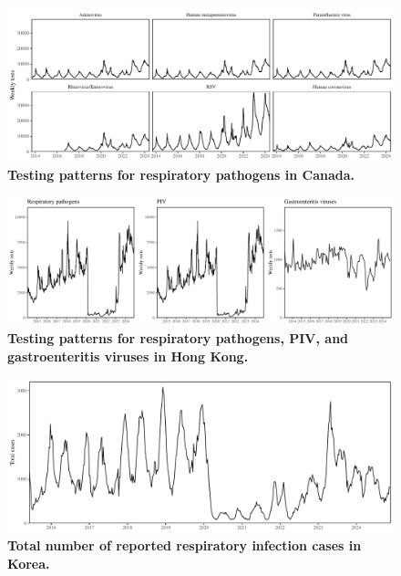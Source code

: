 \documentclass[12pt]{article}
\begin{document}
\pagebreak

\begin{figure}[!th]
\begin{center}
\includegraphics[width=\textwidth]{../figure_test/figure_test_canada.pdf}
\caption{
\textbf{Testing patterns for respiratory pathogens in Canada.}
}
\end{center}
\end{figure}

\pagebreak

\begin{figure}[!th]
\begin{center}
\includegraphics[width=\textwidth]{../figure_test/figure_test_hongkong.pdf}
\caption{
\textbf{Testing patterns for respiratory pathogens, PIV, and gastroenteritis viruses in Hong Kong.}
}
\end{center}
\end{figure}


\pagebreak

\begin{figure}[!th]
\begin{center}
\includegraphics[width=\textwidth]{../figure_test/figure_test_korea.pdf}
\caption{
\textbf{Total number of reported respiratory infection cases in Korea.}
}
\end{center}
\end{figure}
\end{document}

